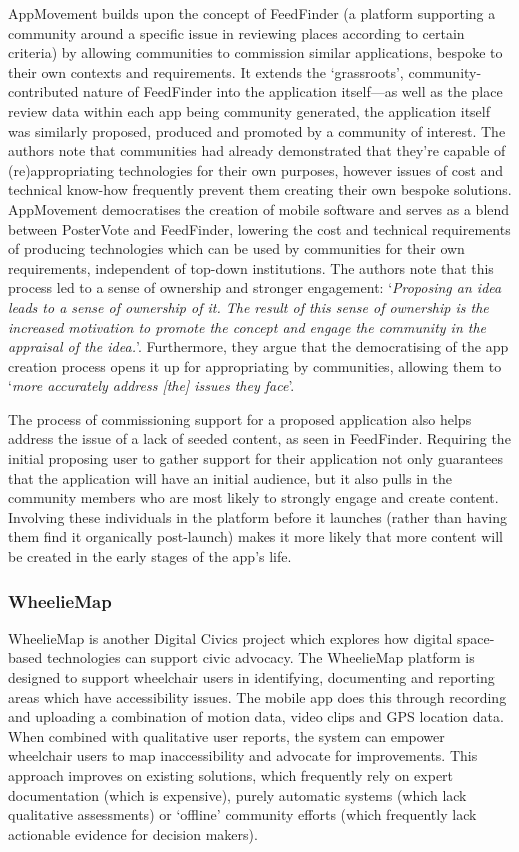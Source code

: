 AppMovement builds upon the concept of FeedFinder (a platform supporting a community around a specific issue in reviewing places according to certain criteria) by allowing communities to commission similar applications, bespoke to their own contexts and requirements. It extends the `grassroots', community-contributed nature of FeedFinder into the application itself---as well as the place review data within each app being community generated, the application itself was similarly proposed, produced and promoted by a community of interest. The authors note that communities had already demonstrated that they're capable of (re)appropriating technologies for their own purposes, however issues of cost and technical know-how frequently prevent them creating their own bespoke solutions. AppMovement democratises the creation of mobile software and serves as a blend between PosterVote and FeedFinder, lowering the cost and technical requirements of producing technologies which can be used by communities for their own requirements, independent of top-down institutions. The authors note that this process led to a sense of ownership and stronger engagement: `\textit{Proposing an idea leads to a sense of ownership of it. The result of this sense of ownership is the increased motivation to promote the concept and engage the community in the appraisal of the idea.}'. Furthermore, they argue that the democratising of the app creation process opens it up for appropriating by communities, allowing them to `\textit{more accurately address [the] issues they face}'.

The process of commissioning support for a proposed application also helps address the issue of a lack of seeded content, as seen in FeedFinder. Requiring the initial proposing user to gather support for their application not only guarantees that the application will have an initial audience, but it also pulls in the community members who are most likely to strongly engage and create content. Involving these individuals in the platform before it launches (rather than having them find it organically post-launch) makes it more likely that more content will be created in the early stages of the app's life.

\subsubsection{WheelieMap}

WheelieMap \citep{Kirkham2017} is another Digital Civics project which explores how digital space-based technologies can support civic advocacy. The WheelieMap platform is designed to support wheelchair users in identifying, documenting and reporting areas which have accessibility issues. The mobile app does this through recording and uploading a combination of motion data, video clips and GPS location data. When combined with qualitative user reports, the system can empower wheelchair users to map inaccessibility and advocate for improvements. This approach improves on existing solutions, which frequently rely on expert documentation (which is expensive), purely automatic systems (which lack qualitative assessments) or `offline' community efforts (which frequently lack actionable evidence for decision makers). 

